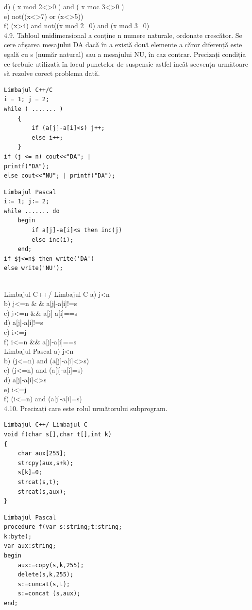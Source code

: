 d) ( x mod 2<>0 ) and ( x moc 3<>0 )
\\
e) not((x<>7) or (x<>5))
\\
f) (x>4) and not((x mod 2=0) and (x mod 3=0)
\\
4.9. Tabloul unidimensional a conține n numere naturale, ordonate crescător. Se cere afișarea mesajului DA dacă în a există două elemente a căror diferență este egală cu s (număr natural) sau a mesajului NU, în caz contrar. Precizați condiția ce trebuie utilizată în locul punctelor de suspensie astfel încât secvența următoare să rezolve corect problema dată.
\begin{verbatim}
Limbajul C++/C
i = 1; j = 2;
while ( ....... )
    {
        if (a[j]-a[i]<s) j++;
        else i++;
    }
if (j <= n) cout<<"DA"; |
printf("DA");
else cout<<"NU"; | printf("DA");
\end{verbatim}
\begin{verbatim}
Limbajul Pascal
i:= 1; j:= 2;
while ....... do
    begin
        if a[j]-a[i]<s then inc(j)
        else inc(i);
    end;
if $j<=n$ then write('DA')
else write('NU');
\end{verbatim}
\\
Limbajul C++/ Limbajul C
a) j<n
\\
b) j<=n \& & a[j]-a[i]!=s
\\
c) j<=n \&\& a[j]-a[i]==s
\\
d) a[j]-a[i]!=s
\\
e) i<=j
\\
f) i<=n \&\& a[j]-a[i]==s
\\
Limbajul Pascal
a) j<n
\\
b) (j<=n) and (a[j]-a[i]<>s)
\\
c) (j<=n) and (a[j]-a[i]=s)
\\
d) a[j]-a[i]<>s
\\
e) i<=j
\\
f) (i<=n) and (a[j]-a[i]=s)
\\
4.10. Precizați care este rolul următorului subprogram.
\begin{verbatim}
Limbajul C++/ Limbajul C
void f(char s[],char t[],int k)
{
    char aux[255];
    strcpy(aux,s+k);
    s[k]=0;
    strcat(s,t);
    strcat(s,aux);
}
\end{verbatim}
\begin{verbatim}
Limbajul Pascal
procedure f(var s:string;t:string;
k:byte);
var aux:string;
begin
    aux:=copy(s,k,255);
    delete(s,k,255);
    s:=concat(s,t);
    s:=concat (s,aux);
end;
\end{verbatim}
\\
